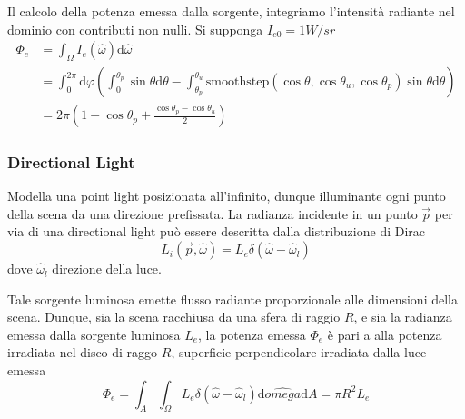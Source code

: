 Il calcolo della potenza emessa dalla sorgente, integriamo l'intensit\`a radiante nel dominio con contributi non nulli. Si supponga 
\mbox{$I_{e0}=1 \si{W/sr}$}
\begin{align}
	\Phi_e&=\int_{\Omega}I_e(\hat{\omega})\mathrm{d}\hat{\omega} \nonumber\\
		&=\int_0^{2\pi}\mathrm{d}\varphi\left(\int_0^{\theta_p}\sin\theta\mathrm{d}\theta-\int_{\theta_p}^{\theta_u}
			\mathrm{smoothstep}(\cos\theta,\cos\theta_u,\cos\theta_p)\sin\theta\mathrm{d}\theta\right) \nonumber \\
	&=2\pi\left(1-\cos\theta_p+\frac{\cos\theta_p-\cos\theta_u}{2}\right)
\end{align}
\subsubsection{Directional Light}
Modella una point light posizionata all'infinito, dunque illuminante ogni punto della scena da una direzione prefissata. La radianza incidente in un 
punto $\vec{p}$ per via di una directional light pu\`o essere descritta dalla distribuzione di Dirac
\begin{equation}
	L_i(\vec{p},\hat{\omega})=L_e\delta(\hat{\omega}-\hat{\omega}_l)
\end{equation}
dove $\hat{\omega}_l$ direzione della luce.\par
Tale sorgente luminosa emette flusso radiante proporzionale alle dimensioni della scena. Dunque, sia la scena racchiusa da una sfera di raggio $R$,
e sia la radianza emessa dalla sorgente luminosa $L_e$, la potenza emessa $\Phi_e$ \`e pari a alla potenza irradiata nel disco di raggo $R$, superficie
perpendicolare irradiata dalla luce emessa
\begin{equation}
	\Phi_e=\int_A\int_{\Omega}L_e\delta(\hat{\omega}-\hat{\omega}_l)\mathrm{d}\hat{omega}\mathrm{d}A=\pi R^2L_e
\end{equation}
